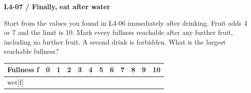 \documentclass[11pt,a4paper]{article}
\begin{document}
\par\noindent\begin{minipage}{\linewidth}
\textbf{L4-07 / Finally, eat after water}\par\smallskip Start from the values you found in L4-06 immediately after drinking. Fruit adds 4 or 7 and the limit is 10. Mark every fullness reachable after any further fruit, including no further fruit. A second drink is forbidden. What is the largest reachable fullness?\par
\par\medskip \begingroup\footnotesize\setlength{\tabcolsep}{4pt}\renewcommand{\arraystretch}{1.35}\begin{tabularx}{\linewidth}{>{\raggedright\arraybackslash}l>{\raggedright\arraybackslash}X>{\raggedright\arraybackslash}X>{\raggedright\arraybackslash}X>{\raggedright\arraybackslash}X>{\raggedright\arraybackslash}X>{\raggedright\arraybackslash}X>{\raggedright\arraybackslash}X>{\raggedright\arraybackslash}X>{\raggedright\arraybackslash}X>{\raggedright\arraybackslash}X>{\raggedright\arraybackslash}X}\toprule\textbf{Fullness f} & \textbf{0} & \textbf{1} & \textbf{2} & \textbf{3} & \textbf{4} & \textbf{5} & \textbf{6} & \textbf{7} & \textbf{8} & \textbf{9} & \textbf{10}\\\midrule
wet[f] &  &  &  &  &  &  &  &  &  &  & \\
\bottomrule\end{tabularx}\endgroup\par\medskip 
\end{minipage}\par\vspace{4mm}
\end{document}
